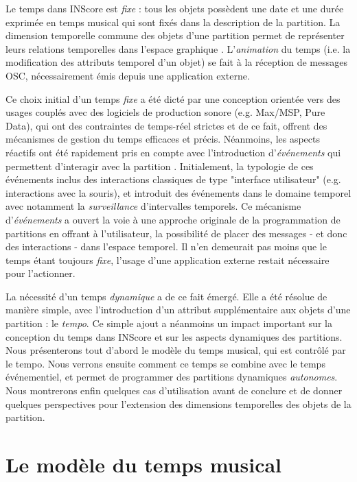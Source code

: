 \documentclass{article}
\begin{document}
Le temps dans INScore \cite{Fober:12a} est \emph{fixe} : tous les objets possèdent une date et une durée exprimée en temps musical qui sont fixés dans la description de la partition. La dimension temporelle commune des objets d'une partition  permet de représenter leurs relations temporelles dans l'espace graphique \cite{fober:10b}. L'\emph{animation} du temps (i.e. la modification des attributs temporel d'un objet) se fait à la réception de messages OSC, nécessairement émis depuis une application externe.

Ce choix initial d'un temps \emph{fixe} a été dicté par une conception orientée vers des usages couplés avec des logiciels de production sonore (e.g. Max/MSP, Pure Data), qui ont des contraintes de temps-réel strictes et de ce fait, offrent des mécanismes de gestion du temps efficaces et précis. Néanmoins, les aspects réactifs ont été rapidement pris en compte avec l'introduction d'\textit{événements} qui permettent d'interagir avec la partition \cite{fober13a}. Initialement, la typologie de ces événements inclus des interactions classiques de type "interface utilisateur" (e.g. interactions avec la souris), et introduit des événements dans le domaine temporel avec notamment la \textit{surveillance} d'intervalles temporels. Ce mécanisme d'\textit{événements} a ouvert la voie à une approche originale de la programmation de partitions en offrant à l'utilisateur, la possibilité de placer des messages - et donc des interactions - dans l'espace temporel. Il n'en demeurait pas moins que le temps étant toujours \emph{fixe}, l'usage d'une application externe restait nécessaire pour l'actionner.

La nécessité d'un temps \emph{dynamique} a de ce fait émergé. Elle a été résolue de manière simple, avec l'introduction d'un attribut supplémentaire aux objets d'une partition : le \emph{tempo}. Ce simple ajout a néanmoins un impact important sur la conception du temps dans INScore et sur les aspects dynamiques des partitions. Nous présenterons tout d'abord le modèle du temps musical, qui est contrôlé par le tempo. Nous verrons ensuite comment ce temps se combine avec le temps événementiel, et permet de programmer des partitions dynamiques \emph{autonomes}. Nous montrerons enfin quelques cas d'utilisation avant de conclure et de donner quelques perspectives pour l'extension des dimensions temporelles des objets de la partition.


\section{Le modèle du temps musical}\label{mustime}
\end{document}
